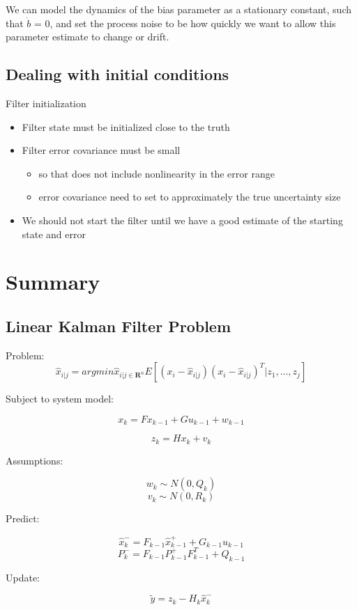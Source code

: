 \documentclass[11pt]{article}
\begin{document}
We can model the dynamics of the bias parameter as a stationary constant, such that $\dot b$ = 0, and set the process noise to be how quickly we want to allow this parameter estimate to change or drift.


\subsection{Dealing with initial conditions}

Filter initialization 
\begin{itemize}
    \item Filter state must be initialized close to the truth 
    \item Filter error covariance must be small 
    \begin{itemize}  
      \item so that does not include nonlinearity in the error range 
      \item error covariance need to set to approximately the true uncertainty size 
    \end{itemize}
   \item We should not start the filter until we have a good estimate of the starting state and error 
\end{itemize}


\section{Summary}
\subsection{Linear Kalman Filter Problem}

Problem:
\[ \hat{x}_{i|j} = argmin \hat{x}_{i|j \in \mathbf{R}^n} E[(x_i - \hat{x}_{i|j}) (x_i - \hat{x}_{i|j})^T | z_1, ..., z_j]  \]

Subject to system model:

\[ x_k = F x_{k-1} + G u_{k-1} + w_{k-1} \] 

\[ z_k = H x_k + v_k \]


Assumptions:

\[ w_k \sim N(0, Q_k) \] 
\[ v_k \sim N(0, R_k) \]


Predict:

\[ \hat{x}^-_k = F_{k-1} \hat{x}^+_{k-1} + G_{k-1} u_{k-1} \] 
\[ P^-_k = F_{k-1} P_{k-1}^+ F^T_{k-1} + Q_{k-1} \]


Update: 

\[ \tilde{y} = z_k - H_k  \hat{x}^-_k  \] 
\end{document}

